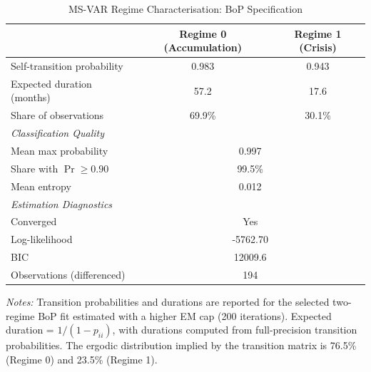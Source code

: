 \begin{table}[htbp]
\centering
\caption{MS-VAR Regime Characterisation: BoP Specification}
\label{tab:regime_char}
\begin{tabular}{lcc}
\toprule
& Regime 0 (Accumulation) & Regime 1 (Crisis) \\
\midrule
Self-transition probability & 0.983 & 0.943 \\
Expected duration (months) & 57.2 & 17.6 \\
Share of observations & 69.9\% & 30.1\% \\
\midrule
\multicolumn{3}{l}{\textit{Classification Quality}} \\
Mean max probability & \multicolumn{2}{c}{0.997} \\
Share with $\Pr \geq 0.90$ & \multicolumn{2}{c}{99.5\%} \\
Mean entropy & \multicolumn{2}{c}{0.012} \\
\midrule
\multicolumn{3}{l}{\textit{Estimation Diagnostics}} \\
Converged & \multicolumn{2}{c}{Yes} \\
Log-likelihood & \multicolumn{2}{c}{-5762.70} \\
BIC & \multicolumn{2}{c}{12009.6} \\
Observations (differenced) & \multicolumn{2}{c}{194} \\
\bottomrule
\end{tabular}
\begin{tablenotes}
\small
\item \textit{Notes:} Transition probabilities and durations are reported for the selected two-regime BoP fit estimated with a higher EM cap (200 iterations). Expected duration = $1/(1-p_{ii})$, with durations computed from full-precision transition probabilities. The ergodic distribution implied by the transition matrix is 76.5\% (Regime 0) and 23.5\% (Regime 1).
\end{tablenotes}
\end{table}